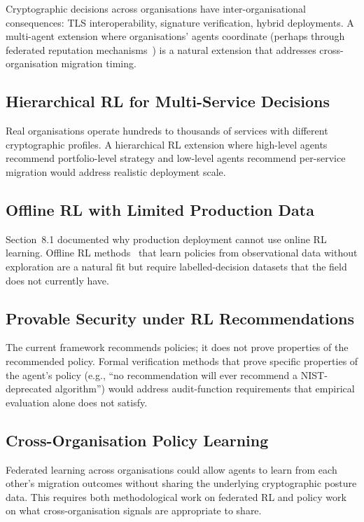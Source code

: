 \documentclass[sigconf,nonacm]{acmart}
\begin{document}
Cryptographic decisions across organisations have inter-organisational
consequences: TLS interoperability, signature verification, hybrid
deployments. A multi-agent extension where organisations' agents
coordinate (perhaps through federated reputation
mechanisms~\cite{kairouz2024fedml}) is a natural extension that
addresses cross-organisation migration timing.

\subsection{Hierarchical RL for Multi-Service Decisions}

Real organisations operate hundreds to thousands of services with
different cryptographic profiles. A hierarchical RL extension where
high-level agents recommend portfolio-level strategy and low-level
agents recommend per-service migration would address realistic
deployment scale.

\subsection{Offline RL with Limited Production Data}

Section~8.1 documented why production deployment cannot use online
RL learning. Offline RL methods~\cite{levine2024offlinesurv} that
learn policies from observational data without exploration are a
natural fit but require labelled-decision datasets that the field
does not currently have.

\subsection{Provable Security under RL Recommendations}

The current framework recommends policies; it does not prove
properties of the recommended policy. Formal verification methods
that prove specific properties of the agent's policy
(e.g., ``no recommendation will ever recommend a NIST-deprecated
algorithm'') would address audit-function requirements that
empirical evaluation alone does not satisfy.

\subsection{Cross-Organisation Policy Learning}

Federated learning across organisations could allow agents to learn
from each other's migration outcomes without sharing the underlying
cryptographic posture data. This requires both methodological work
on federated RL and policy work on what cross-organisation signals
are appropriate to share.
\end{document}
